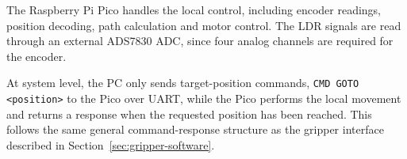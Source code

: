 

The Raspberry Pi Pico handles the local control, including encoder readings, position decoding, path calculation and motor control. The LDR signals are read through an external ADS7830 ADC\cite{ads7830_datasheet}, since four analog channels are required for the encoder.

At system level, the PC only sends target-position commands, \texttt{CMD GOTO <position>} to the Pico over UART, while the Pico performs the local movement and returns a response when the requested position has been reached. This follows the same general command-response structure as the gripper interface described in Section~\ref{sec:gripper-software}.


%




